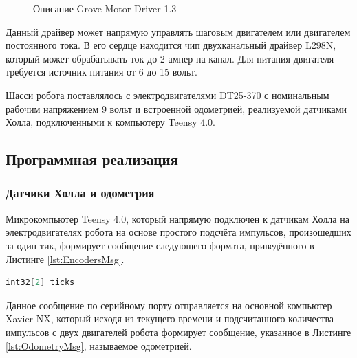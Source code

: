 \documentclass[12pt,a4paper]{scrartcl}
\begin{document}
				\begin{figure}[h]
					\caption{Описание Grove Motor Driver 1.3\cite{bib:GroveMotorDriverDesc}}
					\label{fig:GroveDesc}
				\end{figure}	
				
				Данный драйвер может напрямую управлять шаговым двигателем или двигателем постоянного тока. В его сердце находится чип двухканальный драйвер L298N, который может обрабатывать ток до 2 ампер на канал. Для питания двигателя требуется источник питания от 6 до 15 вольт\cite{bib:GroveMotorDriverDesc}. 
				
				Шасси робота поставлялось с электродвигателями DT25-370 с номинальным рабочим напряжением 9 вольт и встроенной одометрией, реализуемой датчиками Холла, подключенными к компьютеру Teensy 4.0\cite{bib:DT25-370Desc}.
			\subsection{Программная реализация}
				\subsubsection{Датчики Холла и одометрия}
					Микрокомпьютер Teensy 4.0, который напрямую подключен к датчикам Холла на электродвигателях робота на основе простого подсчёта импульсов, произошедших за один тик, формирует сообщение следующего формата, приведённого в Листинге \ref{lst:EncodersMsg}.
					
					\begin{lstlisting}[language=C,caption={Формат сообщения diffbot\_msgs/Encoders\cite{bib:DiffbotEncodersMsg}},label={lst:EncodersMsg}]
int32[2] ticks
					\end{lstlisting}
					
					Данное сообщение по серийному порту отправляется на основной компьютер Xavier NX, который исходя из текущего времени и подсчитанного количества импульсов с двух двигателей робота формирует сообщение, указанное в Листинге \ref{lst:OdometryMsg}, называемое одометрией.
					
\end{document}
